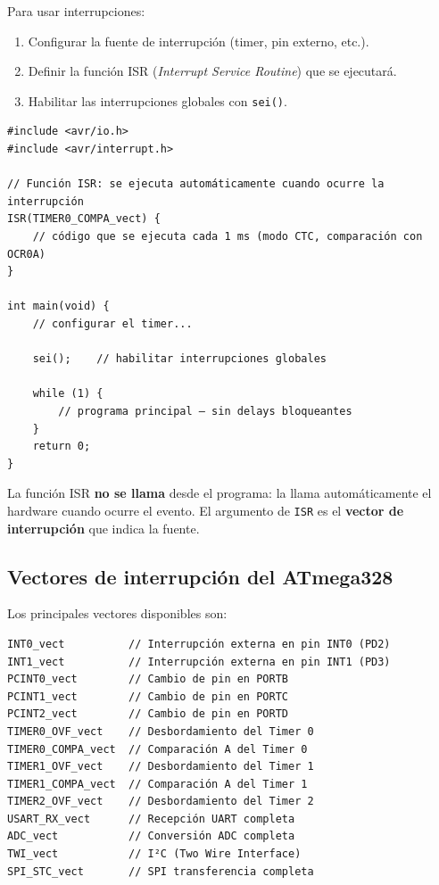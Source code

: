 Para usar interrupciones:

\begin{enumerate}
    \item Configurar la fuente de interrupción (timer, pin externo, etc.).
    \item Definir la función ISR (\textit{Interrupt Service Routine}) que se ejecutará.
    \item Habilitar las interrupciones globales con \texttt{sei()}.
\end{enumerate}

\begin{lstlisting}[style=estilo-c]
#include <avr/io.h>
#include <avr/interrupt.h>

// Función ISR: se ejecuta automáticamente cuando ocurre la interrupción
ISR(TIMER0_COMPA_vect) {
    // código que se ejecuta cada 1 ms (modo CTC, comparación con OCR0A)
}

int main(void) {
    // configurar el timer...

    sei();    // habilitar interrupciones globales

    while (1) {
        // programa principal — sin delays bloqueantes
    }
    return 0;
}
\end{lstlisting}

La función ISR \textbf{no se llama} desde el programa: la llama automáticamente el
hardware cuando ocurre el evento. El argumento de \texttt{ISR} es el \textbf{vector
de interrupción} que indica la fuente.

\subsection{Vectores de interrupción del ATmega328}

Los principales vectores disponibles son:

\begin{lstlisting}[style=estilo-c]
INT0_vect          // Interrupción externa en pin INT0 (PD2)
INT1_vect          // Interrupción externa en pin INT1 (PD3)
PCINT0_vect        // Cambio de pin en PORTB
PCINT1_vect        // Cambio de pin en PORTC
PCINT2_vect        // Cambio de pin en PORTD
TIMER0_OVF_vect    // Desbordamiento del Timer 0
TIMER0_COMPA_vect  // Comparación A del Timer 0
TIMER1_OVF_vect    // Desbordamiento del Timer 1
TIMER1_COMPA_vect  // Comparación A del Timer 1
TIMER2_OVF_vect    // Desbordamiento del Timer 2
USART_RX_vect      // Recepción UART completa
ADC_vect           // Conversión ADC completa
TWI_vect           // I²C (Two Wire Interface)
SPI_STC_vect       // SPI transferencia completa
\end{lstlisting}

